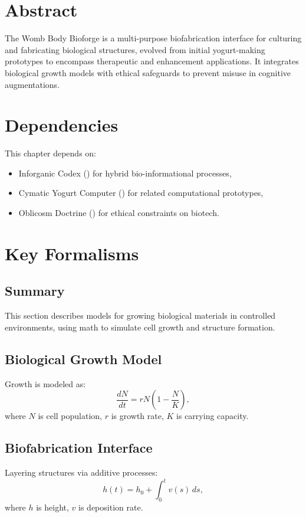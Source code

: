 \documentclass[11pt,oneside]{memoir}
\theoremstyle{plain}
\begin{document}
\section{Abstract}
The Womb Body Bioforge is a multi-purpose biofabrication interface for culturing and fabricating biological structures, evolved from initial yogurt-making prototypes to encompass therapeutic and enhancement applications. It integrates biological growth models with ethical safeguards to prevent misuse in cognitive augmentations.

\section{Dependencies}
This chapter depends on:
\begin{itemize}
    \item Inforganic Codex () for hybrid bio-informational processes,
    \item Cymatic Yogurt Computer () for related computational prototypes,
    \item Oblicosm Doctrine () for ethical constraints on biotech.
\end{itemize}

\section{Key Formalisms}
\subsection{Summary}
This section describes models for growing biological materials in controlled environments, using math to simulate cell growth and structure formation.

\subsection{Biological Growth Model}
Growth is modeled as:
\begin{equation}
    \frac{dN}{dt} = r N \left(1 - \frac{N}{K}\right),
\end{equation}
where \(N\) is cell population, \(r\) is growth rate, \(K\) is carrying capacity.

\subsection{Biofabrication Interface}
Layering structures via additive processes:
\begin{equation}
    h(t) = h_0 + \int_0^t v(s) \, ds,
\end{equation}
where \(h\) is height, \(v\) is deposition rate.
\end{document}
